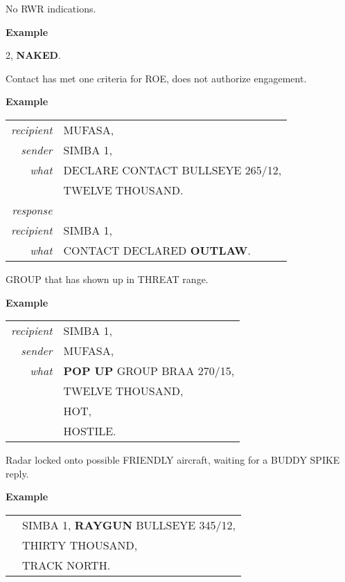 \begin{tcoloritemize}
    \blueitem[NAKED]
    No RWR indications.

    \medskip
    \textbf{Example}
    \begin{center}
        \begin{minipage}{0.9\textwidth}
            2, \textbf{NAKED}.
        \end{minipage}
    \end{center}

    \blueitem[OUTLAW]
    Contact has met one criteria for ROE, does not authorize engagement.

    \medskip
    \textbf{Example}
    \begin{center}
        \begin{tabular}{>{\itshape}r l}
            recipient & MUFASA, \\
            sender & SIMBA 1, \\
            what & DECLARE CONTACT BULLSEYE 265/12, \\
            & TWELVE THOUSAND. \\
            response & \\
            recipient & SIMBA 1, \\
            what & CONTACT DECLARED \textbf{OUTLAW}. \\
        \end{tabular}
    \end{center}

    \blueitem[POP UP]
    GROUP that has shown up in THREAT range.

    \medskip
    \textbf{Example}
    \begin{center}
        \begin{tabular}{>{\itshape}r l}
            recipient & SIMBA 1, \\
            sender & MUFASA, \\
            what & \textbf{POP UP} GROUP BRAA 270/15, \\
            & TWELVE THOUSAND, \\
            & HOT, \\
            & HOSTILE. \\
        \end{tabular}
    \end{center}

    \blueitem[RAYGUN]
    Radar locked onto possible FRIENDLY aircraft, waiting for a BUDDY SPIKE reply.

    \medskip
    \textbf{Example}
    \begin{center}
        \begin{tabular}{>{\itshape}r l}
            & SIMBA 1, \textbf{RAYGUN} BULLSEYE 345/12, \\
            & THIRTY THOUSAND, \\
            & TRACK NORTH. \\
        \end{tabular}
    \end{center}


\end{tcoloritemize}
